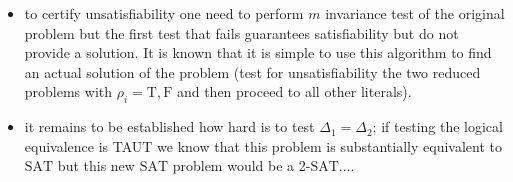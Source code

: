 \documentclass[a4paper,twoside,11pt]{article}
\begin{document}
{\begin{itemize}
This can be verified with simple algebra manipulation: take the reduced ${\ensuremath{\mbox{SAT}}}_1$problem made only by the clauses in which ${\ensuremath{\rho}}_i$ appears and then remove all the apearences of ${\ensuremath{\rho}}_i$, this produces a reduced $(k-1)$-{\ensuremath{\mbox{SAT}}}{} with $m-1$ variables ${\ensuremath{\mbox{SAT}}}_1'$, that put in its (\ref{formula_SAT_EFB_3}) form is exactly ${\ensuremath{\mbox{SAT}}}_1' = {\ensuremath{\mathbb{1}}} - \Delta_1$;
\item to certify unsatisfiability one need to perform $m$ invariance test of the original problem but the first test that fails guarantees satisfiability but do not provide a solution. It is known that it is simple to use this algorithm to find an actual solution of the problem (test for unsatisfiability the two reduced problems with ${\ensuremath{\rho}}_i = \mathrm{T}, \mathrm{F}$ and then proceed to all other literals).
\item it remains to be established how hard is to test $\Delta_1 = \Delta_2$; if testing the logical equivalence is TAUT we know that this problem is substantially equivalent to {\ensuremath{\mbox{SAT}}}{} but this new {\ensuremath{\mbox{SAT}}}{} problem would be a 2-{\ensuremath{\mbox{SAT}}}....
\end{itemize}

} 
\end{document}
